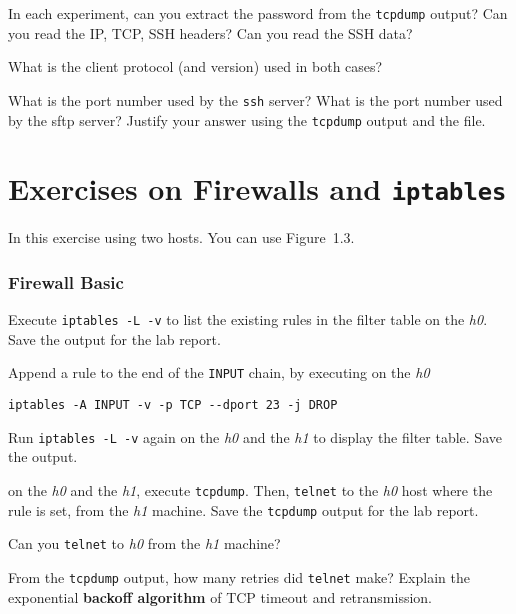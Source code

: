 \documentclass{../UTNetLab}
\begin{document}
    \begin{report}
        \item In each experiment, can you extract the password from the \lstinline{tcpdump} output?
            Can you read the IP, TCP, SSH headers?
            Can you read the SSH data?
        
        \item What is the client protocol (and version) used in both cases?
        
        \item What is the port number used by the \lstinline{ssh} server?
            What is the port number used by the sftp server?
            Justify your answer using the \lstinline{tcpdump} output and the  file.
    \end{report}

\part{Exercises on Firewalls and \texttt{iptables}}
    In this exercise using two hosts.
    You can use Figure~1.3.

\section{Firewall Basic}
    Execute \lstinline{iptables -L -v} to list the existing rules in the filter table on the \textit{h0}.
    Save the output for the lab report.

    Append a rule to the end of the \texttt{INPUT} chain, by executing on the \textit{h0}
    \begin{lstlisting}[morekeywords={[3]INPUT,TCP,DROP}]
iptables -A INPUT -v -p TCP --dport 23 -j DROP
    \end{lstlisting}
    
    Run \lstinline{iptables -L -v} again on the \textit{h0} and the \textit{h1} to display the filter table.
    Save the output.

    on the \textit{h0} and the \textit{h1}, execute \lstinline{tcpdump}.
    Then, \lstinline{telnet} to the \textit{h0} host where the rule is set, from the \textit{h1} machine.
    Save the \lstinline{tcpdump} output for the lab report.

    \begin{report}
        \item Can you \lstinline{telnet} to \textit{h0} from the \textit{h1} machine?
        
        \item From the \lstinline{tcpdump} output, how many retries did \lstinline{telnet} make?
        Explain the exponential \textbf{backoff algorithm} of TCP timeout and retransmission.
    \end{report}
    
\end{document}
